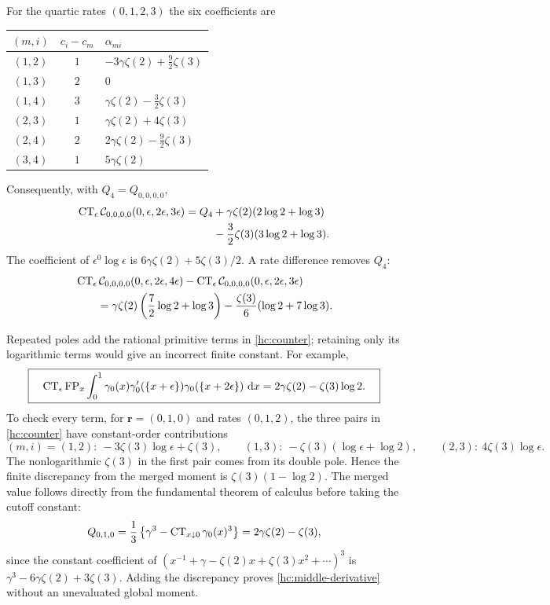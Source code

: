 For the quartic rates $(0,1,2,3)$ the six coefficients are
\begin{center}
\begin{tabular}{ccl}
\hline
$(m,i)$ & $c_i-c_m$ & $\alpha_{mi}$\\
\hline
$(1,2)$ & $1$ & $-3\gamma\zeta(2)+\tfrac92\zeta(3)$\\
$(1,3)$ & $2$ & $0$\\
$(1,4)$ & $3$ & $\gamma\zeta(2)-\tfrac32\zeta(3)$\\
$(2,3)$ & $1$ & $\gamma\zeta(2)+4\zeta(3)$\\
$(2,4)$ & $2$ & $2\gamma\zeta(2)-\tfrac92\zeta(3)$\\
$(3,4)$ & $1$ & $5\gamma\zeta(2)$\\
\hline
\end{tabular}
\end{center}
Consequently, with $Q_4=Q_{0,0,0,0}$,
\begin{align}
 \operatorname{CT}_{\epsilon}\mathcal C_{0,0,0,0}(0,\epsilon,2\epsilon,3\epsilon)
 =Q_4
 &+\gamma\zeta(2)(2\log2+\log3)\notag\\
 &-\frac32\zeta(3)(3\log2+\log3).
 \label{hc:quartic}
\end{align}
The coefficient of $\epsilon^0\log\epsilon$ is
$6\gamma\zeta(2)+5\zeta(3)/2$. A rate difference removes $Q_4$:
\begin{align}
 &\operatorname{CT}_{\epsilon}\mathcal C_{0,0,0,0}(0,\epsilon,2\epsilon,4\epsilon)
 -\operatorname{CT}_{\epsilon}\mathcal C_{0,0,0,0}(0,\epsilon,2\epsilon,3\epsilon)
 \notag\\
 &\qquad=\gamma\zeta(2)\left(\frac72\log2+\log3\right)
       -\frac{\zeta(3)}6(\log2+7\log3).
 \label{hc:quartic-difference}
\end{align}

Repeated poles add the rational primitive terms in
\eqref{hc:counter}; retaining only its logarithmic terms would give
an incorrect finite constant. For example,
\begin{equation}\label{hc:middle-derivative}
 \boxed{\quad
 \operatorname{CT}_{\epsilon}\operatorname{FP}_x\int_0^1
   \gamma_0(x)\gamma_0'(\{x+\epsilon\})
                         \gamma_0(\{x+2\epsilon\})\,\,\mathrm d x
 =2\gamma\zeta(2)-\zeta(3)\log2.
 \quad}
\end{equation}
To check every term, for $\boldsymbol r=(0,1,0)$ and rates $(0,1,2)$,
the three pairs in \eqref{hc:counter} have constant-order contributions
\[
 (m,i)=(1,2):\ -3\zeta(3)\log\epsilon+\zeta(3),\qquad
 (1,3):\ -\zeta(3)(\log\epsilon+\log2),\qquad
 (2,3):\ 4\zeta(3)\log\epsilon.
\]
The nonlogarithmic $\zeta(3)$ in the first pair comes from its double
pole. Hence the finite discrepancy from the merged moment is
$\zeta(3)(1-\log2)$. The merged value follows directly from the
fundamental theorem of calculus before taking the cutoff constant:
\[
 Q_{0,1,0}=\frac13\left\{\gamma^3-
                 \operatorname{CT}_{x\downarrow0}\gamma_0(x)^3\right\}
          =2\gamma\zeta(2)-\zeta(3),
\]
since the constant coefficient of
$(x^{-1}+\gamma-\zeta(2)x+\zeta(3)x^2+\cdots)^3$ is
$\gamma^3-6\gamma\zeta(2)+3\zeta(3)$. Adding the discrepancy proves
\eqref{hc:middle-derivative} without an unevaluated global moment.

